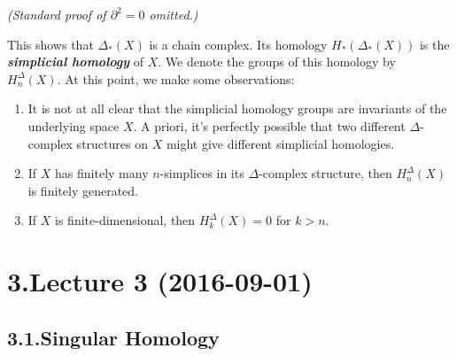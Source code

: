 \documentclass{article}
\begin{document}
\emph{(Standard proof of $\partial^2 = 0$ omitted.)}%

This shows that $\Delta_*(X)$ is a chain complex. Its homology $H_*(\Delta_*(X))$ is the \textbf{\emph{simplicial homology}} of $X.$ We denote the groups of this homology by $H_n^\Delta(X).$ At this point, we make some observations:%

\begin{enumerate}%

\item{}
It is not at all clear that the simplicial homology groups are invariants of the underlying space $X.$ A priori, it's perfectly possible that two different $\Delta$-complex structures on $X$ might give different simplicial homologies.%

\item{}
If $X$ has finitely many $n$-simplices in its $\Delta$-complex structure, then $H_n^\Delta(X)$ is finitely generated.%

\item{}
If $X$ is finite-dimensional, then $H_k^\Delta(X) = 0$ for $k > n.$%
\end{enumerate}%

\section{3.\hspace*{0.5em}Lecture 3 (2016-09-01)}\label{sec-lecture-3-2016-09-01}%

\subsection{3.1.\hspace*{0.5em}Singular Homology}\label{sec-singular-homology}%
\end{document}
